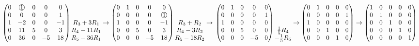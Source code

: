 \documentclass[12pt]{article}
\newcommand*{\mcirc}[1]{\text{\raisebox{.5pt}{\textcircled{\raisebox{-.9pt} {#1}}}}}
\begin{document}
$\begin{pmatrix}
    0 &  \mcirc{1} &  0 &  0 &  0 \\
    0 &  0 & 0 &  0 & 1 \\
    1 &  -2 & 0 &  0 & -1 \\
    0 &  11 & 5 & 0 & 3 \\
    0 &  36 & 0 & -5 & 18
\end{pmatrix} \begin{matrix}
    \\
    \\
    R_3 + 3R_1 \\
    R_4 - 11R_1 \\
    R_5 - 36R_1
\end{matrix} \to \begin{pmatrix}
    0 & 1 & 0 &  0 &  0 \\
    0 & 0 & 0 &  0 &  \mcirc{1} \\
    1 & 0 & 0 &  0 & -1 \\
    0 & 0 & 5 &  0 &  3 \\
    0 & 0 & 0 & -5 & 18
\end{pmatrix} \begin{matrix}
    \\
    \\
    R_3 + R_2 \\
    R_4 - 3R_2 \\
    R_5 - 18R_2
\end{matrix} \to \\\\\\
\begin{pmatrix}
    0 & 1 & 0 &  0 & 0 \\
    0 & 0 & 0 &  0 & 1 \\
    1 & 0 & 0 &  0 & 0 \\
    0 & 0 & 5 &  0 & 0 \\
    0 & 0 & 0 & -5 & 0
\end{pmatrix} \begin{matrix}
    \\
    \\
    \\
    \frac{1}{5}R_4 \\
    -\frac{1}{5}R_5 \\
\end{matrix} \to \begin{pmatrix}
    0 & 1 & 0 & 0 & 0 \\
    0 & 0 & 0 & 0 & 1 \\
    1 & 0 & 0 & 0 & 0 \\
    0 & 0 & 1 & 0 & 0 \\
    0 & 0 & 0 & 1 & 0
\end{pmatrix} \to \begin{pmatrix}
    1 & 0 & 0 & 0 & 0 \\
    0 & 1 & 0 & 0 & 0 \\
    0 & 0 & 1 & 0 & 0 \\
    0 & 0 & 0 & 1 & 0 \\
    0 & 0 & 0 & 0 & 1
\end{pmatrix} $
\end{document}

